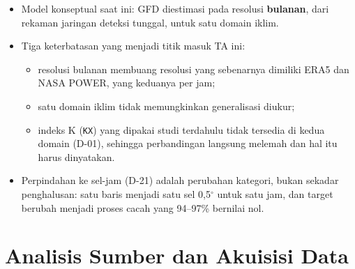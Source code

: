 \begin{itemize}
    \item Model konseptual saat ini: GFD diestimasi pada resolusi
          \textbf{bulanan}, dari rekaman jaringan deteksi tunggal, untuk satu
          domain iklim.
    \item Tiga keterbatasan yang menjadi titik masuk TA ini:
          \begin{itemize}
              \item resolusi bulanan membuang resolusi yang sebenarnya dimiliki
                    ERA5 dan NASA POWER, yang keduanya per jam;
              \item satu domain iklim tidak memungkinkan generalisasi diukur;
              \item indeks K (\texttt{KX}) yang dipakai studi terdahulu tidak
                    tersedia di kedua domain (D-01), sehingga perbandingan
                    langsung melemah dan hal itu harus dinyatakan.
          \end{itemize}
    \item Perpindahan ke sel-jam (D-21) adalah perubahan kategori, bukan
          sekadar penghalusan: satu baris menjadi satu sel 0,5$^\circ$ untuk
          satu jam, dan target berubah menjadi proses cacah yang 94--97\%
          bernilai nol.

\end{itemize}

\section{Analisis Sumber dan Akuisisi Data}
\label{sec:sumber-data}


